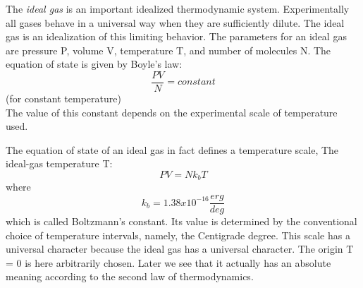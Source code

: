 \begin{definition}
    The \emph{ideal gas} is an important idealized thermodynamic system. Experimentally all gases behave in a universal way when they are sufficiently dilute. The ideal gas is an idealization of this limiting behavior. The parameters for an ideal gas are pressure P, volume V, temperature T, and number of molecules N. The equation of state is given by Boyle's law:
    \[
        \frac{PV}{N} = constant  
    \] (for constant temperature)\\
    The value of this constant depends on the experimental scale of temperature used.
\end{definition}
\begin{definition}
    The equation of state of an ideal gas in fact defines a temperature scale, The ideal-gas temperature T:
    \[
        PV = N k_{b}  T
    \]
    where
    \[
        k_{b} = 1.38 x 10^{-16} \frac{erg}{deg} 
    \]
    which is called Boltzmann's constant. Its value is determined by the conventional choice of temperature intervals, namely, the Centigrade degree. This scale has a universal character because the ideal gas has a universal character. The origin T = 0 is here arbitrarily chosen. Later we see that it actually has an absolute meaning according to the second law of thermodynamics.
\end{definition}
